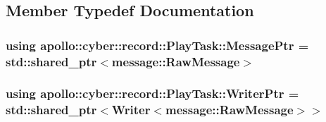 \subsection{Member Typedef Documentation}
\hypertarget{classapollo_1_1cyber_1_1record_1_1PlayTask_a77f6d771bbb5a21c67a533a3c36efb77}{
\subsubsection[{Message\-Ptr}]{\setlength{\rightskip}{0pt plus 5cm}using {\bf apollo\-::cyber\-::record\-::\-Play\-Task\-::\-Message\-Ptr} =  std\-::shared\-\_\-ptr$<${\bf message\-::\-Raw\-Message}$>$}}\label{classapollo_1_1cyber_1_1record_1_1PlayTask_a77f6d771bbb5a21c67a533a3c36efb77}
\hypertarget{classapollo_1_1cyber_1_1record_1_1PlayTask_ab836ae21967a8fc00e1b556152bbfc9a}{
\subsubsection[{Writer\-Ptr}]{\setlength{\rightskip}{0pt plus 5cm}using {\bf apollo\-::cyber\-::record\-::\-Play\-Task\-::\-Writer\-Ptr} =  std\-::shared\-\_\-ptr$<${\bf Writer}$<${\bf message\-::\-Raw\-Message}$>$$>$}}\label{classapollo_1_1cyber_1_1record_1_1PlayTask_ab836ae21967a8fc00e1b556152bbfc9a}


